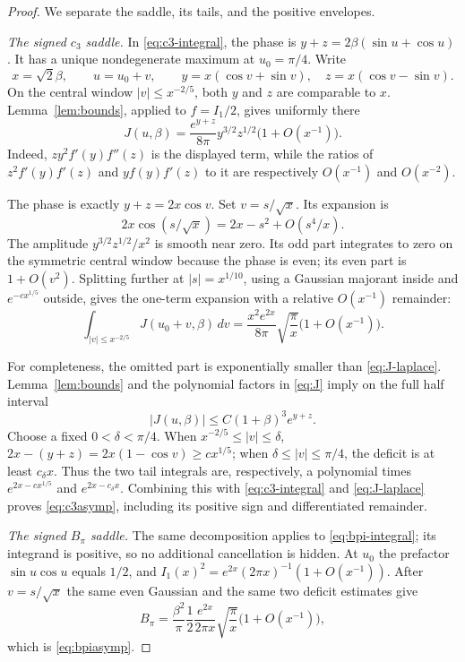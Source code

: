 \documentclass[11pt]{article}
\theoremstyle{definition}
\theoremstyle{remark}
\begin{document}
\begin{proof}
We separate the saddle, its tails, and the positive envelopes.

\smallskip
\noindent\emph{The signed $c_3$ saddle.}
In \eqref{eq:c3-integral}, the phase is
$y+z=2\beta(\sin u+\cos u)$.  It has a unique nondegenerate maximum at
$u_0=\pi/4$.  Write
\[
 x=\sqrt2\beta,\qquad u=u_0+v,
 \qquad y=x(\cos v+\sin v),\quad z=x(\cos v-\sin v).
\]
On the central window $|v|\leq x^{-2/5}$, both $y$ and $z$ are comparable
to $x$.  Lemma~\ref{lem:bounds}, applied to $f=I_1/2$, gives uniformly
there
\begin{equation}\label{eq:J-central}
 J(u,\beta)=\frac{e^{y+z}}{8\pi}y^{3/2}z^{1/2}
 \bigl(1+O(x^{-1})\bigr).
\end{equation}
Indeed, $zy^2f'(y)f''(z)$ is the displayed term, while the ratios of
$z^2f'(y)f'(z)$ and $yf(y)f'(z)$ to it are respectively $O(x^{-1})$
and $O(x^{-2})$.

The phase is exactly $y+z=2x\cos v$.  Set $v=s/\sqrt{x}$.  Its expansion
is
\[
 2x\cos(s/\sqrt{x})=2x-s^2+O(s^4/x).
\]
The amplitude $y^{3/2}z^{1/2}/x^2$ is smooth near zero.  Its odd part
integrates to zero on the symmetric central window because the phase is
even; its even part is $1+O(v^2)$.  Splitting further at
$|s|=x^{1/10}$, using a Gaussian majorant inside and
$e^{-c x^{1/5}}$ outside, gives the one-term expansion with a relative
$O(x^{-1})$ remainder:
\begin{equation}\label{eq:J-laplace}
 \int_{|v|\leq x^{-2/5}}J(u_0+v,\beta)\,dv
 =\frac{x^2e^{2x}}{8\pi}\sqrt{\frac\pi x}
 \bigl(1+O(x^{-1})\bigr).
\end{equation}

For completeness, the omitted part is exponentially smaller than
\eqref{eq:J-laplace}.  Lemma~\ref{lem:bounds} and the polynomial factors
in \eqref{eq:J} imply on the full half interval
\begin{equation}\label{eq:J-global}
 |J(u,\beta)|\leq C(1+\beta)^3e^{y+z}.
\end{equation}
Choose a fixed $0<\delta<\pi/4$.  When
$x^{-2/5}\leq|v|\leq\delta$,
$2x-(y+z)=2x(1-\cos v)\geq c x^{1/5}$; when
$\delta\leq|v|\leq\pi/4$, the deficit is at least $c_\delta x$.
Thus the two tail integrals are, respectively, a polynomial times
$e^{2x-cx^{1/5}}$ and $e^{2x-c_\delta x}$.  Combining this with
\eqref{eq:c3-integral} and \eqref{eq:J-laplace} proves
\eqref{eq:c3asymp}, including its positive sign and differentiated
remainder.

\smallskip
\noindent\emph{The signed $B_\pi$ saddle.}
The same decomposition applies to \eqref{eq:bpi-integral}; its integrand
is positive, so no additional cancellation is hidden.  At $u_0$ the
prefactor $\sin u\cos u$ equals $1/2$, and
$I_1(x)^2=e^{2x}(2\pi x)^{-1}(1+O(x^{-1}))$.  After
$v=s/\sqrt{x}$ the same even Gaussian and the same two deficit estimates
give
\[
 B_\pi=\frac{\beta^2}{\pi}\frac12
 \frac{e^{2x}}{2\pi x}\sqrt{\frac\pi x}
 \bigl(1+O(x^{-1})\bigr),
\]
which is \eqref{eq:bpiasymp}.


\end{proof}
\end{document}
